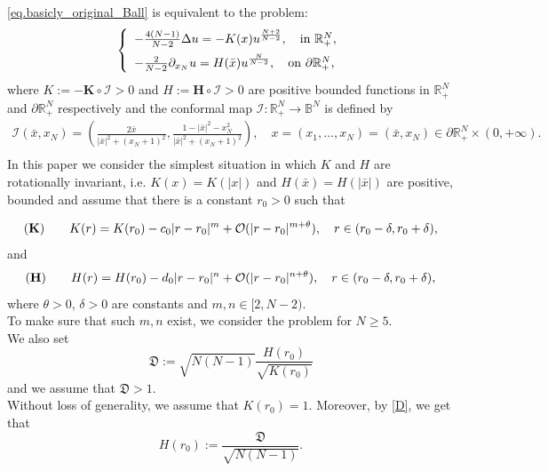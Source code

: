 \documentclass[11pt,a4paper]{amsart}
\begin{document}
\eqref{eq.basicly_original_Ball} is equivalent to the problem:
\begin{align}\label{pb}
  \left\{
    \begin{array}{l}
      -\frac{4(N-1)}{N-2}\Delta u = -K(x) u^{\frac{N+2}{N-2}}, \quad \text{in}~\mathbb{R}_{+}^{N},\vspace{5pt}\\
      -\frac{2}{N-2}\partial_{x_N}u =  H(\bar x) u^{\frac{N}{N-2}}, \quad \text{on}~ \partial\mathbb{R}_{+}^{N},
    \end{array}
  \right.
\end{align}
where $ K:= - \mathbf K\circ\mathscr I >0$ and $H:=\mathbf H\circ\mathscr I >0$ are positive bounded functions in $\mathbb R_+^N$ and $\partial\mathbb R_+^N$ respectively and the conformal map $\mathscr I:\mathbb R^N_+\to\mathbb B^N$ is defined by
\begin{align}\label{eq.inversion_map}
  \mathscr I\left(\bar x,x_N\right)=\left(\frac{2\bar x}{|\bar x|^2+{(x_N+1)}^2},\frac{1-|{\bar x}|^2-x_N^2}{|\bar x|^2+{(x_N+1)}^2}\right),\quad x=(x_1,\ldots, x_N) = \left(\bar x,x_N\right)\in\partial\mathbb R^N_+\times(0,+\infty).\\
  \end{align}
In this paper we consider the simplest situation in which $K$ and $H$ are rotationally invariant, i.e. $ K(x)= K(|x|)$ and $H(\bar{x})= H(|\bar{x}|)$ are positive, bounded and assume that there is a constant $r_0 > 0$ such that 

$$ ({\bf K})  \qquad K(r)=K(r_0)-c_0|r-r_0|^m+\mathcal O(|r-r_0|^{m+\theta}),\quad r\in(r_0-\delta, r_0+\delta),$$
and
$$({\bf H})\qquad 
H(r)=H(r_0)-d_0|r-r_0|^n+\mathcal O(|r-r_0|^{n+\theta}),\quad r\in(r_0-\delta, r_0+\delta),$$
where  $\theta>0$, $\delta>0$  are constants and $m, n\in [2, N-2)$.\\
To make sure that such $m, n$ exist, we consider the problem for $N\geq 5$.\\
We also set
\begin{equation}\label{D}
\mathfrak D := \sqrt{N\left(N-1\right)}\frac{H(r_0)}{\sqrt{K(r_0)}}\end{equation}
and we assume that $\mathfrak D>1$.\\
Without loss of generality, we assume that $K(r_0)=1$. Moreover, by \eqref{D}, we get that
$$H(r_0):=\frac{\mathfrak D}{\sqrt{N(N-1)}}.$$
\end{document}
